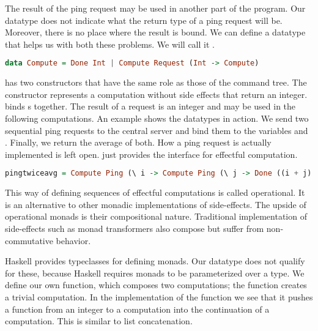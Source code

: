 The result of the ping request may be used in another part of the program. Our  datatype does not indicate what the return type of a ping request will be. Moreover, there is no place where the result is bound. We can define a datatype that helps us with both these problems. We will call it .

\begin{lstlisting}[language=Haskell]
data Compute = Done Int | Compute Request (Int -> Compute)
\end{lstlisting}

 has two constructors that have the same role as those of the command tree. The  constructor represents a computation without side effects that return an integer.  binds s together. The result of a request is an integer and may be used in the following computations. An example shows the datatypes in action. We send two sequential ping requests to the central server and bind them to the variables  and . Finally, we return the average of both. How a ping request is actually implemented is left open.  just provides the interface for effectful computation.

\begin{lstlisting}[language=Haskell]
pingtwiceavg = Compute Ping (\ i -> Compute Ping (\ j -> Done ((i + j) `div` 2)))
\end{lstlisting}

This way of defining sequences of effectful computations is called operational\autocite{operationalmonad}. It is an alternative to other monadic implementations of side-effects. The upside of operational monads is their compositional nature. Traditional implementation of side-effects such as monad transformers\autocite{DBLP:conf/popl/LiangHJ95} also compose but suffer from non-commutative behavior.

Haskell provides typeclasses for defining monads. Our  datatype does not qualify for these, because Haskell requires monads to be parameterized over a type. We define our own  function, which composes two computations; the  function creates a trivial computation. In the implementation of the  function we see that it pushes a function from an integer to a computation into the continuation of a computation. This is similar to list concatenation.

